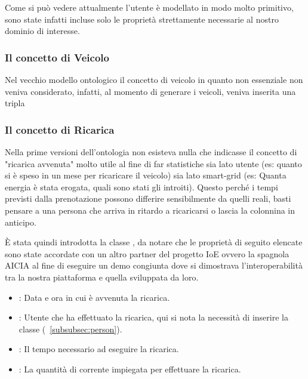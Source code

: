 \noindent
Come si può vedere attualmente l'utente è modellato in modo molto primitivo, sono state infatti incluse solo le proprietà strettamente necessarie al nostro dominio di interesse. 

\subsubsection{Il concetto di Veicolo}\label{subsubsec:vehicle}

Nel vecchio modello ontologico il concetto di veicolo in quanto non essenziale non veniva considerato, infatti, al momento di generare i veicoli, veniva inserita una tripla 

\subsubsection{Il concetto di Ricarica}

Nella prime versioni dell'ontologia non esisteva nulla che indicasse il concetto di "ricarica avvenuta" molto utile al fine di far statistiche sia lato utente (es: quanto si è speso in un mese per ricaricare il veicolo) sia lato smart-grid (es: Quanta energia è stata erogata, quali sono stati gli introiti). Questo perché i tempi previsti dalla prenotazione possono differire sensibilmente da quelli reali, basti pensare a una persona che arriva in ritardo a ricaricarsi o lascia la colonnina in anticipo. 


È stata quindi introdotta la classe , da notare che le proprietà di seguito elencate sono state accordate con un altro partner del progetto IoE ovvero la spagnola AICIA al fine di eseguire un demo congiunta dove si dimostrava l'interoperabilità tra la nostra piattaforma e quella sviluppata da loro.

\begin{itemize}
	\item {}: Data e ora in cui è avvenuta la ricarica.
	\item {}: Utente che ha effettuato la ricarica, qui si nota la necessità di inserire la classe  (~\ref{subsubsec:person}).
	\item {}: Il tempo necessario ad eseguire la ricarica.
	\item {}: La quantità di corrente impiegata per effettuare la ricarica.
\end{itemize}

